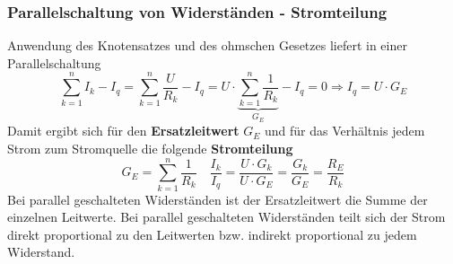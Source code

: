 \subsubsection{Parallelschaltung von Widerständen - Stromteilung}
Anwendung des Knotensatzes und des ohmschen Gesetzes liefert in einer Parallelschaltung
\begin{equation}
\boxed{\displaystyle \sum_{k=1}^n I_k-I_q=\displaystyle \sum_{k=1}^n \dfrac{U}{R_k}-I_q=U\cdot \underbrace{\displaystyle \sum_{k=1}^n \dfrac{1}{R_k}}_{G_E}-I_q=0\Longrightarrow I_q=U\cdot G_E}
\end{equation}
Damit ergibt sich für den \textbf{Ersatzleitwert} $G_E$ und für das Verhältnis jedem Strom zum Stromquelle die folgende \textbf{Stromteilung}
\begin{equation}
\boxed{G_E=\displaystyle \sum_{k=1}^n\dfrac{1}{R_k}}\quad \boxed{\dfrac{I_k}{I_q}=\dfrac{U\cdot G_k}{U\cdot G_E}=\dfrac{G_k}{G_E}=\dfrac{R_E}{R_k}}
\end{equation}
Bei parallel geschalteten Widerständen ist der Ersatzleitwert die Summe der einzelnen Leitwerte. Bei parallel geschalteten Widerständen teilt sich der Strom direkt proportional zu den Leitwerten bzw. indirekt proportional zu jedem Widerstand.
